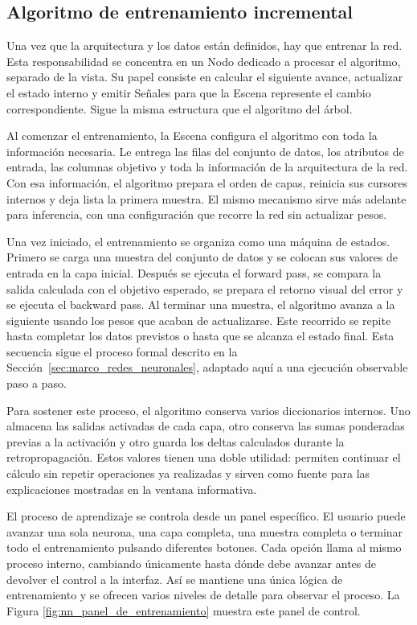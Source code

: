 \subsection{Algoritmo de entrenamiento incremental}

Una vez que la arquitectura y los datos están definidos, hay que entrenar la red.
Esta responsabilidad se concentra en un \gls{Nodo} dedicado a procesar el algoritmo, separado de la vista.
Su papel consiste en calcular el siguiente avance, actualizar el estado interno y emitir Señales para que la \gls{Escena} represente el cambio correspondiente.
Sigue la misma estructura que el algoritmo del árbol.

Al comenzar el entrenamiento, la \gls{Escena} configura el algoritmo con toda la información necesaria.
Le entrega las filas del conjunto de datos, los atributos de entrada, las columnas objetivo y toda la información de la arquitectura de la red.
Con esa información, el algoritmo prepara el orden de capas, reinicia sus cursores internos y deja lista la primera muestra.
El mismo mecanismo sirve más adelante para inferencia, con una configuración que recorre la red sin actualizar pesos.

Una vez iniciado, el entrenamiento se organiza como una máquina de estados.
Primero se carga una muestra del conjunto de datos y se colocan sus valores de entrada en la capa inicial.
Después se ejecuta el forward pass, se compara la salida calculada con el objetivo esperado, se prepara el retorno visual del error y se ejecuta el backward pass.
Al terminar una muestra, el algoritmo avanza a la siguiente usando los pesos que acaban de actualizarse.
Este recorrido se repite hasta completar los datos previstos o hasta que se alcanza el estado final.
Esta secuencia sigue el proceso formal descrito en la Sección~\ref{sec:marco_redes_neuronales}, adaptado aquí a una ejecución observable paso a paso.

Para sostener este proceso, el algoritmo conserva varios diccionarios internos.
Uno almacena las salidas activadas de cada capa, otro conserva las sumas ponderadas previas a la activación y otro guarda los deltas calculados durante la retropropagación.
Estos valores tienen una doble utilidad: permiten continuar el cálculo sin repetir operaciones ya realizadas y sirven como fuente para las explicaciones mostradas en la ventana informativa.

El proceso de aprendizaje se controla desde un panel específico.
El usuario puede avanzar una sola neurona, una capa completa, una muestra completa o terminar todo el entrenamiento pulsando diferentes botones.
Cada opción llama al mismo proceso interno, cambiando únicamente hasta dónde debe avanzar antes de devolver el control a la interfaz.
Así se mantiene una única lógica de entrenamiento y se ofrecen varios niveles de detalle para observar el proceso.
La Figura \ref{fig:nn_panel_de_entrenamiento} muestra este panel de control.

